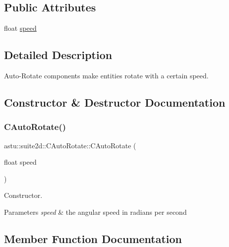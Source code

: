 \subsection*{Public Attributes}
\begin{DoxyCompactItemize}
\item 
float \hyperlink{classastu_1_1suite2d_1_1CAutoRotate_a5757c237b7c9b14fdc43ff763e7b899b}{speed}
\end{DoxyCompactItemize}


\subsection{Detailed Description}
Auto-\/\+Rotate components make entities rotate with a certain speed. 

\subsection{Constructor \& Destructor Documentation}
\mbox{\label{classastu_1_1suite2d_1_1CAutoRotate_a53a16efe41829470f66eb471d2f196ce}} 
\subsubsection{\texorpdfstring{C\+Auto\+Rotate()}{CAutoRotate()}}
{\footnotesize\ttfamily astu\+::suite2d\+::\+C\+Auto\+Rotate\+::\+C\+Auto\+Rotate (\begin{DoxyParamCaption}\item[{float}]{speed }\end{DoxyParamCaption})\hspace{0.3cm}{\ttfamily [inline]}}

Constructor.


\begin{DoxyParams}{Parameters}
{\em speed} & the angular speed in radians per second \\
\hline
\end{DoxyParams}


\subsection{Member Function Documentation}
\mbox{\label{classastu_1_1suite2d_1_1CAutoRotate_af130721018671489c7de3f652ffcc8cf}} 
